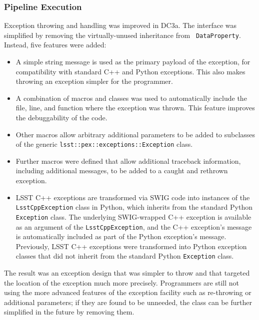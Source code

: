 
\subsubsection{Pipeline Execution}



Exception throwing and handling was improved in DC3a. The interface was
simplified by removing the virtually-unused inheritance from {\tt
DataProperty}.  Instead, five features were added:

\begin{itemize}

\item A simple string message is used as the primary payload of the
exception, for compatibility with standard C++ and Python exceptions.
This also makes throwing an exception simpler for the programmer.

\item A combination of macros and classes was used to automatically
include the file, line, and function where the exception was thrown.
This feature improves the debuggability of the code.

\item Other macros allow arbitrary additional parameters to be added to
subclasses of the generic {\tt lsst::pex::exceptions::Exception} class.

\item Further macros were defined that allow additional traceback
information, including additional messages, to be added to a caught and
rethrown exception.

\item LSST C++ exceptions are transformed via SWIG code into instances
of the {\tt LsstCppException} class in Python, which inherits from the
standard Python {\tt Exception} class.  The underlying SWIG-wrapped C++
exception is available as an argument of the {\tt LsstCppException}, and
the C++ exception's message is automatically included as part of the
Python exception's message.  Previously, LSST C++ exceptions were
transformed into Python exception classes that did not inherit from the
standard Python {\tt Exception} class.

\end{itemize}

The result was an exception design that was simpler to throw and that
targeted the location of the exception much more precisely.  Programmers
are still not using the more advanced features of the exception facility
such as re-throwing or additional parameters; if they are found to be
unneeded, the class can be further simplified in the future by removing
them.



